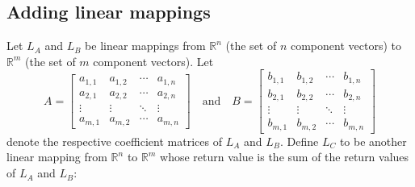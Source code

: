 \documentclass{article}
\begin{document}
\subsection*{Adding linear mappings}

Let \(L_A\) and \(L_B\) be linear mappings from \(\mathbb{R}^n\) (the set of \(n\) component vectors) to \(\mathbb{R}^m\) (the set of \(m\) component vectors). Let 
\[A = \begin{bmatrix} 
a_{1,1} & a_{1,2} & \cdots & a_{1,n} \\
a_{2,1} & a_{2,2} & \cdots & a_{2,n} \\
\vdots & \vdots & \ddots & \vdots \\
a_{m,1} & a_{m,2} & \cdots & a_{m,n} 
\end{bmatrix} \quad\text{and}\quad B = \begin{bmatrix} 
b_{1,1} & b_{1,2} & \cdots & b_{1,n} \\
b_{2,1} & b_{2,2} & \cdots & b_{2,n} \\
\vdots & \vdots & \ddots & \vdots \\
b_{m,1} & b_{m,2} & \cdots & b_{m,n} 
\end{bmatrix}\]
denote the respective coefficient matrices of \(L_A\) and \(L_B\). Define \(L_C\) to be another linear mapping from \(\mathbb{R}^n\) to \(\mathbb{R}^m\) whose return value is the sum of the return values of \(L_A\) and \(L_B\):
\end{document}
